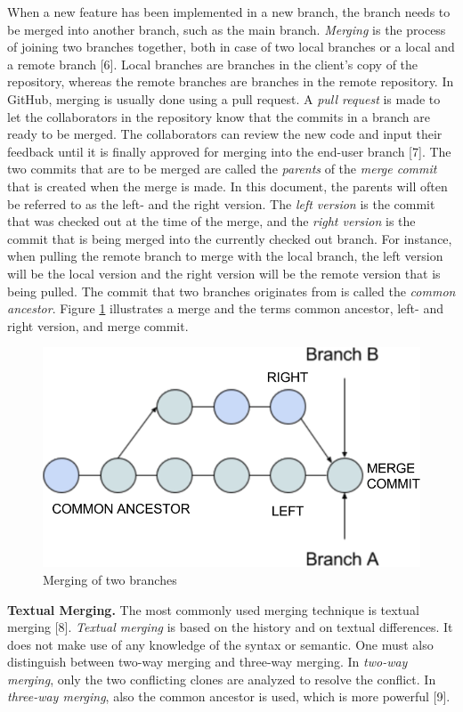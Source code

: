 When a new feature has been implemented in a new branch, the branch needs to be merged into another branch, such as the main branch. \textit{Merging} is the process of joining two branches together, both in case of two local branches or a local and a remote branch [6]. Local branches are branches in the client’s copy of the repository, whereas the remote branches are branches in the remote repository. In GitHub, merging is usually done using a pull request. A \textit{pull request} is made to let the collaborators in the repository know that the commits in a branch are ready to be merged. The collaborators can review the new code and input their feedback until it is finally approved for merging into the end-user branch [7].
\FloatBarrier
The two commits that are to be merged are called the \textit{parents} of the \textit{merge commit} that is created when the merge is made. In this document, the parents will often be referred to as the left- and the right version. The \textit{left version} is the commit that was checked out at the time of the merge, and the \textit{right version} is the commit that is being merged into the currently checked out branch. For instance, when pulling the remote branch to merge with the local branch, the left version will be the local version and the right version will be the remote version that is being pulled. The commit that two branches originates from is called the \textit{common ancestor}. Figure \ref{fig:merging} illustrates a merge and the terms common ancestor, left- and right version, and merge commit.

\begin{figure}[H]
\centering
\includegraphics[width=400pt]{figure/merge.png}
\caption{Merging of two branches}\label{fig:merging}
\end{figure}
\FloatBarrier
\textbf{Textual Merging.} The most commonly used merging technique is textual merging [8]. \textit{Textual merging} is based on the history and on textual differences. It does not make use of any knowledge of the syntax or semantic. One must also distinguish between two-way merging and three-way merging. In \textit{two-way merging}, only the two conflicting clones are analyzed to resolve the conflict. In \textit{three-way merging}, also the common ancestor is used, which is more powerful [9].

